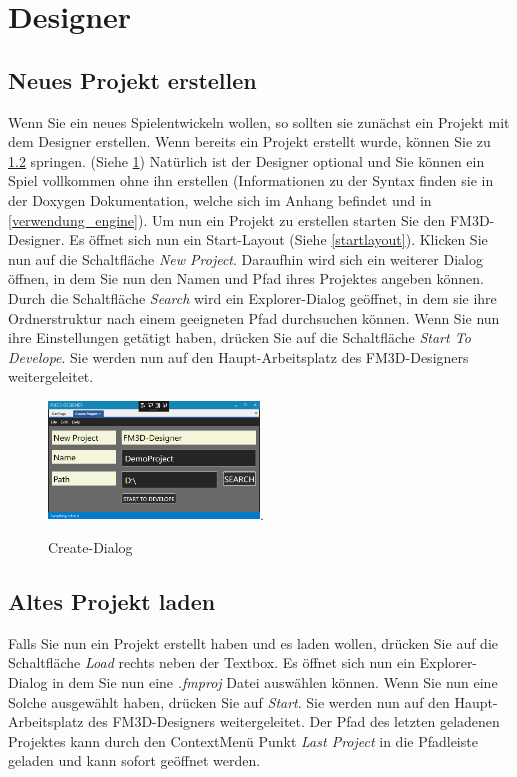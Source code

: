 \section{Designer}
\label{verwendung_designer}

\subsection{Neues Projekt erstellen}
\label{neuesprojekt}
Wenn Sie ein neues Spielentwickeln wollen, so sollten sie zunächst ein Projekt mit dem Designer erstellen. Wenn bereits ein Projekt erstellt wurde, können Sie zu \cref{projektladen} springen. (Siehe \cref{createprojekt})
Natürlich ist der Designer optional und Sie können ein Spiel vollkommen ohne ihn erstellen (Informationen zu der Syntax finden sie in der Doxygen Dokumentation, welche sich im Anhang befindet und in \cref{verwendung_engine}).
Um nun ein Projekt zu erstellen starten Sie den FM3D-Designer. Es öffnet sich nun ein Start-Layout (Siehe \cref{startlayout}). Klicken Sie nun auf die Schaltfläche \textit{New Project}. 
Daraufhin wird sich ein weiterer Dialog öffnen, in dem Sie nun den Namen und Pfad ihres Projektes angeben können. Durch die Schaltfläche \textit{Search} wird ein Explorer-Dialog geöffnet, in dem sie ihre Ordnerstruktur nach einem geeigneten Pfad durchsuchen können. Wenn Sie nun ihre Einstellungen getätigt haben, drücken Sie auf die Schaltfläche \textit{Start To Develope}. Sie werden nun auf den Haupt-Arbeitsplatz des FM3D-Designers weitergeleitet.
\begin{figure}
	\begin{center}
		\includegraphics[width=0.5\textwidth]{04verwendung/Designer/00createproject.PNG}.
		\caption{Create-Dialog}\label{createprojekt}
	\end{center}
\end{figure}

\subsection{Altes Projekt laden}
\label{projektladen}
Falls Sie nun ein Projekt erstellt haben und es laden wollen, drücken Sie auf die Schaltfläche \textit{Load} rechts neben der Textbox. Es öffnet sich nun ein Explorer-Dialog in dem Sie nun eine \textit{.fmproj} Datei auswählen können. Wenn Sie nun eine Solche ausgewählt haben, drücken Sie auf \textit{Start}. Sie werden nun auf den Haupt-Arbeitsplatz des FM3D-Designers weitergeleitet.
Der Pfad des letzten geladenen Projektes kann durch den ContextMenü Punkt \textit{Last Project} in die Pfadleiste geladen und kann sofort geöffnet werden.

